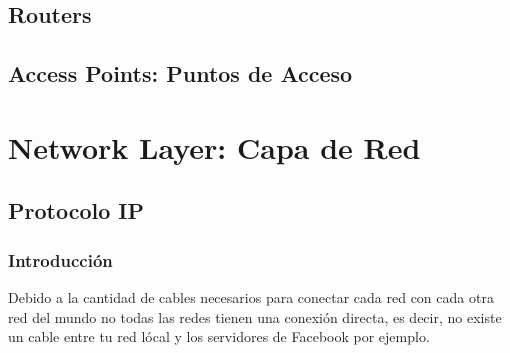 \documentclass[12pt, fleqn]{report}                             %
\theoremstyle{break}                                            %
\begin{document}
    \chapter{Routers}


    \chapter{Access Points: Puntos de Acceso}











\part{Network Layer: Capa de Red}
\clearpage


    \chapter{Protocolo IP}


        \clearpage
        \section{Introducción}

            Debido a la cantidad de cables necesarios para conectar cada red con cada otra red del mundo
            no todas las redes tienen una conexión directa, es decir, no existe un cable entre tu red
            lócal y los servidores de Facebook por ejemplo.
\end{document}
